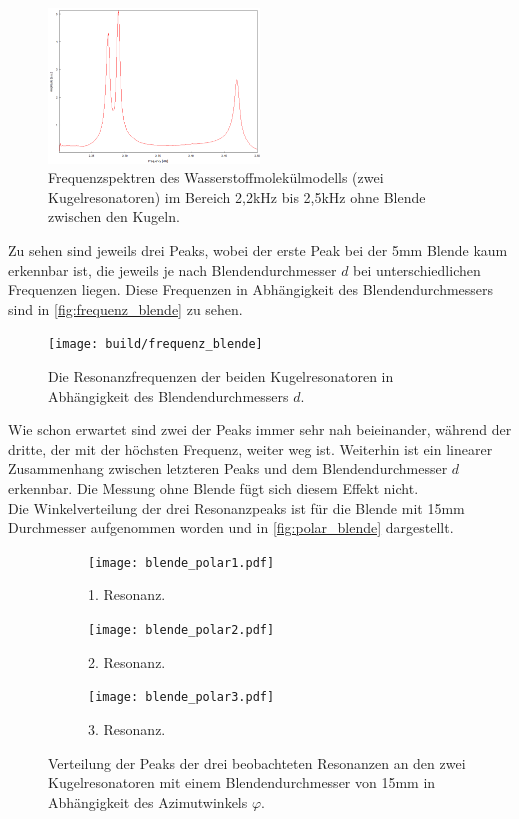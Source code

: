 \begin{figure}
    \centering
    \includegraphics[width=0.5\textwidth]{data/3_1/ohne.png}
    \caption{Frequenzspektren des Wasserstoffmolekülmodells (zwei Kugelresonatoren) im Bereich 2,2\;kHz bis 2,5\;kHz ohne Blende zwischen den Kugeln.}
    \label{fig:ohne}
\end{figure}
Zu sehen sind jeweils drei Peaks, wobei der erste Peak bei der 5\;mm Blende kaum erkennbar ist, 
die jeweils je nach Blendendurchmesser $d$ bei unterschiedlichen Frequenzen liegen. Diese Frequenzen
in Abhängigkeit des Blendendurchmessers sind in \autoref{fig:frequenz_blende} zu sehen.
\begin{figure}
    \centering
    \texttt{[image: build/frequenz\_blende]}
    \caption{Die Resonanzfrequenzen der beiden Kugelresonatoren in Abhängigkeit des Blendendurchmessers $d$.}
    \label{fig:frequenz_blende}
\end{figure} 
Wie schon erwartet sind zwei der Peaks immer sehr nah beieinander, während der dritte, der mit
der höchsten Frequenz, weiter weg ist. Weiterhin ist ein linearer Zusammenhang zwischen
letzteren Peaks und dem Blendendurchmesser $d$ erkennbar. Die Messung ohne Blende fügt sich
diesem Effekt nicht. \\
Die Winkelverteilung der drei Resonanzpeaks ist für die Blende mit 15\;mm Durchmesser aufgenommen worden 
und in \autoref{fig:polar_blende} dargestellt.
\begin{figure}[hp]
    \centering
    \begin{subfigure}[b]{0.48\textwidth}
        \centering
        \texttt{[image: blende\_polar1.pdf]}
        \caption{1. Resonanz.}
    \end{subfigure}
    \hfill
    \begin{subfigure}[b]{0.48\textwidth}
        \centering
        \texttt{[image: blende\_polar2.pdf]}
        \caption{2. Resonanz.}
    \end{subfigure}
    \hfill
    \begin{subfigure}[b]{0.48\textwidth}
        \centering
        \texttt{[image: blende\_polar3.pdf]}
        \caption{3. Resonanz.}
    \end{subfigure}
    \hfill
    \caption{Verteilung der Peaks der drei beobachteten Resonanzen an den zwei Kugelresonatoren mit einem Blendendurchmesser von 15\;mm  in Abhängigkeit des Azimutwinkels $\varphi$.}
    \label{fig:polar_blende}
\end{figure}
